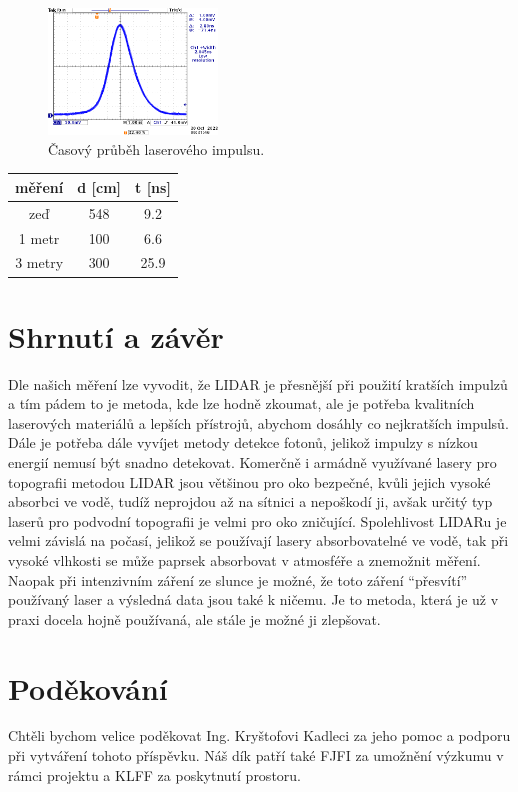 \documentclass[12pt,a4paper]{article}
\begin{document}
\begin{figure}[h!]
    \centering
    \includegraphics[width=0.4\textwidth]{prubeh_impulsu.png}
    \caption{Časový průběh laserového impulsu.}
\end{figure}

\begin{center}
    \begin{tabular}{||c c c||} 
     \hline
      měření & d [cm] & t [ns] \\ [0.5ex] 
     \hline\hline
     zeď & 548 & 9.2 \\ 
     \hline
     1 metr & 100 & 6.6 \\
     \hline
     3 metry & 300 & 25.9 \\
     \hline
    \end{tabular}
    \end{center}
\section{Shrnutí a závěr}
Dle našich měření lze vyvodit, že LIDAR je přesnější při použití kratších impulzů a tím pádem to je metoda, kde lze hodně zkoumat, ale je potřeba kvalitních laserových materiálů a lepších přístrojů, abychom dosáhly co nejkratších impulsů. Dále je potřeba dále vyvíjet metody detekce fotonů, jelikož impulzy s nízkou energií nemusí být snadno detekovat. Komerčně i armádně využívané lasery pro topografii metodou LIDAR jsou většinou pro oko bezpečné, kvůli jejich vysoké absorbci ve vodě, tudíž neprojdou až na sítnici a nepoškodí ji, avšak určitý typ laserů pro podvodní topografii je velmi pro oko zničující. Spolehlivost LIDARu je velmi závislá na počasí, jelikož se používají lasery absorbovatelné ve vodě, tak při vysoké vlhkosti se může paprsek absorbovat v atmosféře a znemožnit měření. Naopak při intenzivním záření ze slunce je možné, že toto záření “přesvítí” používaný laser a výsledná data jsou také k ničemu.
Je to metoda, která je už v praxi docela hojně používaná, ale stále je možné ji zlepšovat.


\section*{Poděkování}
Chtěli bychom velice poděkovat Ing. Kryštofovi Kadleci za jeho pomoc a podporu při vytváření tohoto příspěvku.
Náš dík patří také FJFI za umožnění výzkumu v rámci projektu a KLFF za poskytnutí prostoru.
\printbibliography
\end{document}
